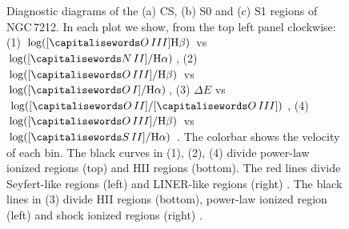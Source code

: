 \documentclass[../thesis.tex]{subfiles}
\begin{document}
\begin{figure}
\centering
{} \quad
{}\\
\\
\caption[]{Diagnostic diagrams of the (a) CS, (b) S0 and (c) S1 regions of NGC\,7212. In each plot we show, from the top left panel clockwise: (1) $\log([\ion{O}{III}] \Hb)$ vs $\log([\ion{N}{II}]/ \Ha)$, (2) $\log([\ion{O}{III}]/ \Hb)$ vs $\log([\ion{O}{I}]/ \Ha)$, (3) $\Delta E$ vs $\log([\ion{O}{II}]/[\ion{O}{III}])$, (4) $\log([\ion{O}{III}]/ \Hb)$ vs $\log([\ion{S}{II}]/ \Ha)$ \citep{Baldwin81, Veilleux87}. The colorbar shows the velocity of each bin. The black curves in (1), (2), (4) divide power-law ionized regions (top) and HII regions (bottom). The red lines divide Seyfert-like regions (left) and LINER-like regions (right) \citep{Kewley06}. The black lines in (3) divide HII regions (bottom), power-law ionized region (left) and shock ionized regions (right) \citep{Baldwin81}. }
\label{fig:diag_s1N}
\end{figure}
\end{document}
